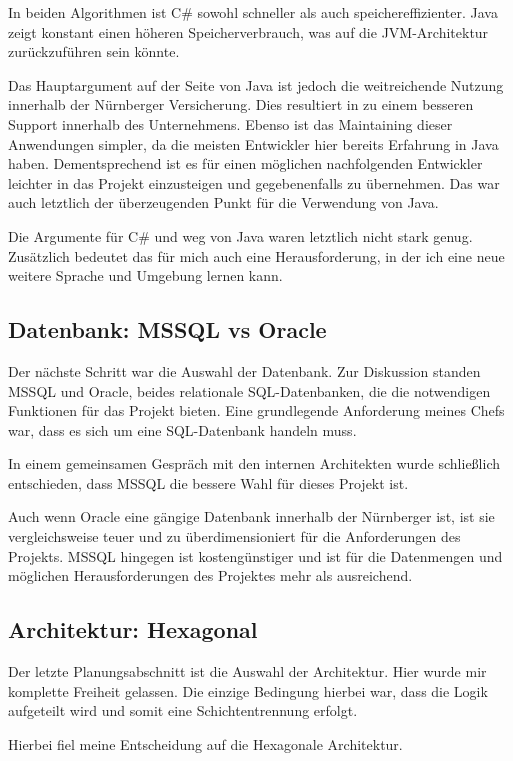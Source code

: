 In beiden Algorithmen ist C\# sowohl schneller als auch speichereffizienter. 
Java zeigt konstant einen höheren Speicherverbrauch, was auf die JVM-Architektur zurückzuführen sein könnte.

Das Hauptargument auf der Seite von Java ist jedoch die weitreichende Nutzung innerhalb der Nürnberger Versicherung. Dies resultiert in zu einem besseren Support innerhalb des Unternehmens.
Ebenso ist das Maintaining dieser Anwendungen simpler, da die meisten Entwickler hier bereits Erfahrung in Java haben. Dementsprechend ist es für einen möglichen nachfolgenden Entwickler leichter
in das Projekt einzusteigen und gegebenenfalls zu übernehmen.
Das war auch letztlich der überzeugenden Punkt für die Verwendung von Java. 

Die Argumente für C\# und weg von Java waren letztlich nicht stark genug.
Zusätzlich bedeutet das für mich auch eine Herausforderung, in der ich eine neue weitere Sprache und Umgebung lernen kann.

\subsection{Datenbank: MSSQL vs Oracle}
Der nächste Schritt war die Auswahl der Datenbank. Zur Diskussion standen MSSQL und Oracle, beides relationale SQL-Datenbanken, 
die die notwendigen Funktionen für das Projekt bieten. Eine grundlegende Anforderung meines Chefs war, dass es sich um eine SQL-Datenbank handeln muss.

In einem gemeinsamen Gespräch mit den internen Architekten wurde schließlich entschieden, dass MSSQL die bessere Wahl für dieses Projekt ist.

Auch wenn Oracle eine gängige Datenbank innerhalb der Nürnberger ist, ist sie vergleichsweise teuer und zu überdimensioniert für die Anforderungen des Projekts.
MSSQL hingegen ist kostengünstiger und ist für die Datenmengen und möglichen Herausforderungen des Projektes mehr als ausreichend. \cite{petri2005comparison}

\subsection{Architektur: Hexagonal}
Der letzte Planungsabschnitt ist die Auswahl der Architektur. Hier wurde mir komplette Freiheit gelassen.
Die einzige Bedingung hierbei war, dass die Logik aufgeteilt wird und somit eine Schichtentrennung erfolgt.

Hierbei fiel meine Entscheidung auf die Hexagonale Architektur.

